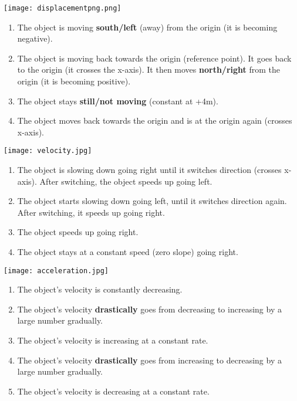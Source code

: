 \documentclass[12pt,fleqn]{book} %
\begin{document}
\pagebreak


\begin{multicols}{2}
    \texttt{[image: displacementpng.png]}
    \columnbreak

    \begin{enumerate}[label=(\alph*)]
        \item The object is moving \textbf{south/left} (away) from the origin (it is becoming negative).
        \item The object is moving back towards the origin (reference point). It goes back to the origin (it crosses the x-axis). It then moves
              \textbf{north/right} from the origin (it is becoming positive).
        \item The object stays \textbf{still/not moving} (constant at +4m).
        \item The object moves back towards the origin and is at the origin again (crosses x-axis).
    \end{enumerate}

\end{multicols}

\begin{multicols}{2}
    \texttt{[image: velocity.jpg]}
    \columnbreak

    \begin{enumerate}[label=(\alph*)]
        \item The object is slowing down going right until it switches direction (crosses x-axis). After switching,
              the object speeds up going left.
        \item The object starts slowing down going left, until it switches direction again. After switching, it speeds up going right.
        \item The object speeds up going right.
        \item The object stays at a constant speed (zero slope) going right.
    \end{enumerate}

\end{multicols}

\begin{multicols}{2}
    \texttt{[image: acceleration.jpg]}
    \columnbreak

    \begin{enumerate}[label=(\alph*)]
        \item The object's velocity is constantly decreasing.
        \item The object's velocity \textbf{drastically} goes from decreasing to increasing by a large number gradually.
        \item The object's velocity is increasing at a constant rate.
        \item The object's velocity \textbf{drastically} goes from increasing to decreasing by a large number gradually.
        \item The object's velocity is decreasing at a constant rate.
    \end{enumerate}

\end{multicols}
\end{document}
